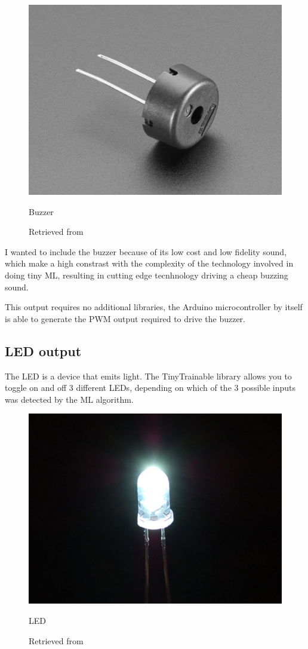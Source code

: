 \begin{figure}[ht]
  \centering
  \includegraphics[width=0.75\linewidth,height=0.25\textheight,keepaspectratio]{images/materials-adafruit-buzzer.jpg}
  \caption{Buzzer}
  \caption*{Retrieved from \cite{website-materials-adafruit-buzzer}}
  \label{fig:materials-adafruit-buzzer}
\end{figure}

I wanted to include the buzzer because of its low cost and low fidelity sound, which make a high constrast with the complexity of the technology involved in doing tiny \acrshort{ML}, resulting in cutting edge tecnhnology driving a cheap buzzing sound. 

This output requires no additional libraries, the Arduino microcontroller by itself is able to generate the \acrfull{PWM} output required to drive the buzzer.

\subsection{LED output}

The \acrshort{LED} is a device that emits light. The TinyTrainable library allows you to toggle on and off 3 different LEDs, depending on which of the 3 possible inputs was detected by the \acrshort{ML} algorithm.

\begin{figure}[ht]
  \centering
  \includegraphics[width=0.75\linewidth,height=0.25\textheight,keepaspectratio]{images/materials-adafruit-led.jpg}
  \caption{LED}
  \caption*{Retrieved from \cite{website-materials-adafruit-led}}
  \label{fig:materials-adafruit-led}
\end{figure}

